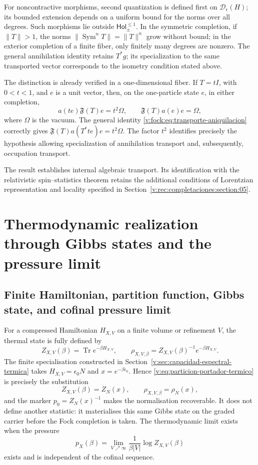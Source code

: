 For noncontractive morphisms, second quantization is defined first
on \(\mathcal D_\epsilon(H)\); its bounded extension depends on a
uniform bound for the norms over all degrees. Such morphisms lie outside
\(\mathsf{Hol}_{\pm}^{\leq1}\). In the symmetric completion, if
\(\|T\|>1\), the norms \(\|\operatorname{Sym}^nT\|=\|T\|^n\)
grow without bound; in the exterior completion of a finite fiber, only
finitely many degrees are nonzero. The general annihilation
identity retains \(T^*g\); its specialization to the same transported
vector corresponds to the isometry condition stated above.

The distinction is already verified in a one-dimensional fiber. If
\(T=tI\), with \(0<t<1\), and \(e\) is a unit vector, then, on the
one-particle state \(e\), in either completion,
\begin{equation}
 a(te)\mathfrak F(T)e=t^2\Omega,
 \qquad \mathfrak F(T)a(e)e=\Omega,
 \label{v:fock:eq:control-no-isometrico}
\end{equation}
where \(\Omega\) is the vacuum. The general identity
\eqref{v:fock:eq:transporte-aniquilacion} correctly gives
\(\mathfrak F(T)a(T^*te)e=t^2\Omega\). The factor \(t^2\) identifies
precisely the hypothesis allowing specialization of annihilation
transport and, subsequently, occupation transport.

The result establishes internal algebraic transport. Its identification
with the relativistic spin--statistics theorem retains the additional
conditions of Lorentzian representation and locality specified in
Section~\ref{v:rec:completaciones:section:05}.

\clearpage
\section{Thermodynamic realization through Gibbs states and the pressure limit}
\label{v:rec:fock_gibbs:section:04}

\subsection{Finite Hamiltonian, partition function, Gibbs state, and cofinal pressure limit}
\label{v:rec:fock_gibbs:section:05}

For a compressed Hamiltonian \(H_{X,V}\) on a finite volume or refinement
\(V\), the thermal state is fully defined by
\[
 Z_{X,V}(\beta)=\operatorname{Tr}e^{-\beta H_{X,V}},
 \qquad
 \rho_{X,V,\beta}=Z_{X,V}(\beta)^{-1}e^{-\beta H_{X,V}}.
\]
The finite specialisation constructed in
Section~\ref{v:sec:capacidad-espectral-termica} takes
$H_{X,V}=\epsilon_0N$ and $x=e^{-\beta\epsilon_0}$. Hence
\eqref{v:eq:particion-portador-termico} is precisely the substitution
\[
 Z_{X,V}(\beta)=Z_N(x),\qquad
 \rho_{X,V,\beta}=\rho_N(x),
\]
and the marker $p_0=Z_N(x)^{-1}$ makes the normalisation recoverable. It
does not define another statistic: it materialises this same Gibbs state
on the graded carrier before the Fock completion is taken.
The thermodynamic limit exists when the pressure
\[
 p_X(\beta)=\lim_{V\nearrow\infty}
 \frac1{\beta |V|}\log Z_{X,V}(\beta)
\]
exists and is independent of the cofinal sequence.

